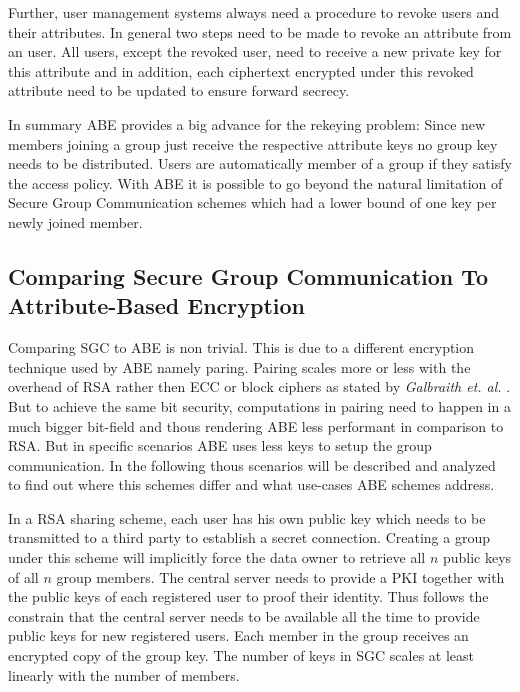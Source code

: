 Further, user management systems always need a procedure to revoke users and their attributes. 
In general two steps need to be made to revoke an attribute from an user. All users, except the revoked user, need to receive a new private key for this attribute and in addition, each ciphertext encrypted under this revoked attribute need to be updated to ensure forward secrecy. 

In summary ABE provides a big advance for the rekeying problem: Since new members joining a group just receive the respective attribute keys no group key needs to be distributed. Users are automatically member of a group if they satisfy the access policy. With \ac{ABE} it is possible to go beyond the natural limitation of Secure Group Communication schemes which had a lower bound of one key per newly joined member.  

\subsection{Comparing Secure Group Communication To Attribute-Based Encryption}
\label{sec:comparing-secure-group-communication-to-attribute-based-encryption}
Comparing \ac{SGC} to \ac{ABE} is non trivial. This is due to a different encryption technique used by \ac{ABE} namely paring. Pairing scales more or less with the overhead of \ac{RSA} rather then \ac{ECC} or block ciphers as stated by \textit{Galbraith et. al.} \cite{galbraith2008pairings}. But to achieve the same bit security, computations in pairing need to happen in a much bigger bit-field and thous rendering \ac{ABE} less performant in comparison to \ac{RSA}. But in specific scenarios \ac{ABE} uses less keys to setup the group communication. In the following thous scenarios will be described and analyzed to find out where this schemes differ and what use-cases \ac{ABE} schemes address.

In a \ac{RSA} sharing scheme, each user has his own public key which needs to be transmitted to a third party to establish a secret connection. Creating a group under this scheme will implicitly force the data owner to retrieve all $n$ public keys of all $n$ group members. The central server needs to provide a \ac{PKI} together with the public keys of each registered user to proof their identity. Thus follows the constrain that the central server needs to be available all the time to provide public keys for new registered users. Each member in the group receives an encrypted copy of the group key. The number of keys in \ac{SGC} scales at least linearly with the number of members. 

